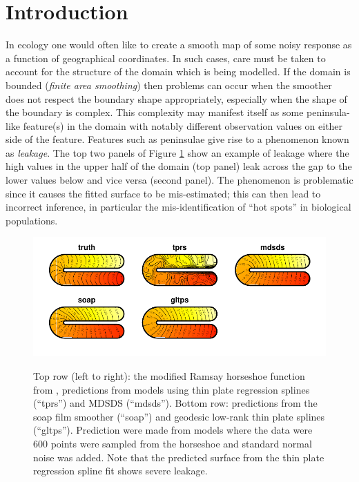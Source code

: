 \documentclass[smallextended]{svjour3}       %
\begin{document}
\section{Introduction \label{IN}}

In ecology one would often like to create a smooth map of some noisy response as a function of geographical coordinates. In such cases, care must be taken to account for the structure of the domain which is being modelled. If the domain is bounded (\textit{finite area smoothing}) then problems can occur when the smoother does not respect the boundary shape appropriately, especially when the shape of the boundary is complex. This complexity may manifest itself as some peninsula-like feature(s) in the domain with notably different observation values on either side of the feature. Features such as peninsulae give rise to a phenomenon known as \emph{leakage}. The top two panels of Figure \ref{leakage} show an example of leakage \citep[taken from][]{Wood:2008vo} where the high values in the upper half of the domain (top panel) leak across the gap to the lower values below and vice versa (second panel). The phenomenon is problematic since it causes the fitted surface to be mis-estimated; this can then lead to incorrect inference, in particular the mis-identification of ``hot spots'' in biological populations.

\begin{figure}
\centering
\includegraphics[width=\textwidth]{examples/ramsay/ramsay-real.pdf}\\
\caption{Top row (left to right): the modified Ramsay horseshoe function from \protect\cite{Wood:2008vo}, predictions from models using thin plate regression splines (``tprs'') and MDSDS (``mdsds''). Bottom row: predictions from the soap film smoother (``soap'') and geodesic low-rank thin plate splines (``gltps''). Prediction were made from models where the data were 600 points were sampled from the horseshoe and standard normal noise was added. Note that the predicted surface from the thin plate regression spline fit shows severe leakage.
\label{leakage}}
\end{figure}
\end{document}
